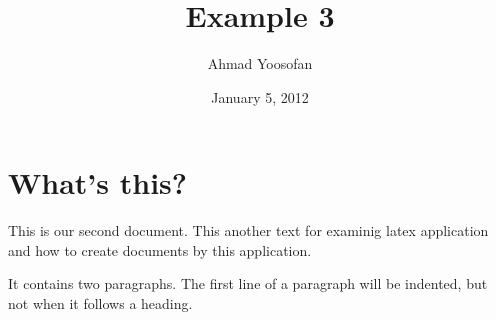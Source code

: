\documentclass[a4paper,11pt]{article}
\begin{document}
\title{Example 3}
\author{Ahmad Yoosofan}
\date{January 5, 2012}
\maketitle
\section{What's this?}
This                              is   our 
      second               document. This another text for examinig latex application and how to create
documents by this application.
	
It contains two paragraphs. The first line of a paragraph will be indented, but not when it follows a heading.
\end{document}
